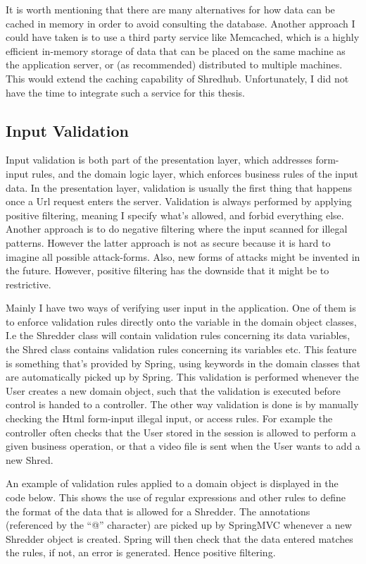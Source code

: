 It is worth mentioning that there are many alternatives for how data can be cached in memory in order to avoid consulting the database. Another approach I could have taken is to use a third party service like Memcached,\cite{memcached} which is a highly efficient in-memory storage of data that can be placed on the same machine as the application server, or (as recommended) distributed to multiple machines. This would extend the caching capability of Shredhub. Unfortunately, I did not have the time to integrate such a service for this thesis. 

\subsection{Input Validation}
Input validation is both part of the presentation layer, which addresses form-input rules, and the domain logic layer, which enforces business rules of the input data. In the presentation layer, validation is usually the first thing that happens once a Url request enters the server. Validation is always performed by applying positive filtering, meaning I specify what's allowed, and forbid everything else. Another approach is to do negative filtering where the input scanned for illegal patterns. However the latter approach is not as secure because it is hard to imagine all possible attack-forms.\cite{sqlinjection} Also, new forms of attacks might be invented in the future. However, positive filtering has the downside that it might be to restrictive.

Mainly I have two ways of verifying user input in the application. One of them is to enforce validation rules directly onto the variable in the domain object classes, I.e the Shredder class will contain validation rules concerning its data variables, the Shred class contains validation rules concerning its variables etc. This feature is something that's provided by Spring, using keywords in the domain classes that are automatically picked up by Spring. This validation is performed whenever the User creates a new domain object, such that the validation is executed before control is handed to a controller. The other way validation is done is by manually checking the Html form-input illegal input, or access rules. For example the controller often checks that the User stored in the session is allowed to perform a given business operation, or that a video file is sent when the User wants to add a new Shred. 

An example of validation rules applied to a domain object is displayed in the code below. This shows the use of regular expressions and other rules to define the format of the data that is allowed for a Shredder. The annotations (referenced by the ``@'' character) are picked up by SpringMVC whenever a new Shredder object is created. Spring will then check that the data entered matches the rules, if not, an error is generated. Hence positive filtering.
	
